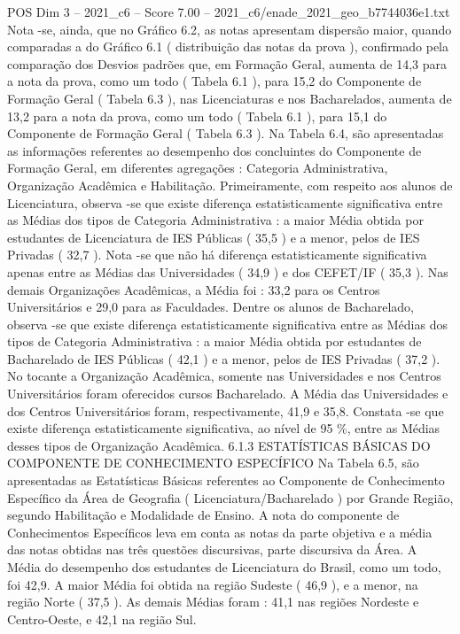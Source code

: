 \begin{textsample}{POS Dim 3 – 2021\_c6 – Score 7.00 – 2021\_c6/enade\_2021\_geo\_b7744036e1.txt}
Nota -se, ainda, que no Gráfico 6.2, as notas apresentam dispersão maior, quando comparadas a do Gráfico 6.1 ( distribuição das notas da prova ), confirmado pela comparação dos Desvios padrões que, em Formação Geral, aumenta de 14,3 para a nota da prova, como um todo ( Tabela 6.1 ), para 15,2 do Componente de Formação Geral ( Tabela 6.3 ), nas Licenciaturas e nos Bacharelados, aumenta de 13,2 para a nota da prova, como um todo ( Tabela 6.1 ), para 15,1 do Componente de Formação Geral ( Tabela 6.3 ).
Na Tabela 6.4, são apresentadas as informações referentes ao desempenho dos concluintes do Componente de Formação Geral, em diferentes agregações : Categoria Administrativa, Organização Acadêmica e Habilitação.
Primeiramente, com respeito aos alunos de Licenciatura, observa -se que existe diferença estatisticamente significativa entre as Médias dos tipos de Categoria Administrativa : a maior Média obtida por estudantes de Licenciatura de IES Públicas ( 35,5 ) e a menor, pelos de IES Privadas ( 32,7 ).
Nota -se que não há diferença estatisticamente significativa apenas entre as Médias das Universidades ( 34,9 ) e dos CEFET/IF ( 35,3 ).
Nas demais Organizações Acadêmicas, a Média foi : 33,2 para os Centros Universitários e 29,0 para as Faculdades.
Dentre os alunos de Bacharelado, observa -se que existe diferença estatisticamente significativa entre as Médias dos tipos de Categoria Administrativa : a maior Média obtida por estudantes de Bacharelado de IES Públicas ( 42,1 ) e a menor, pelos de IES Privadas ( 37,2 ).
No tocante a Organização Acadêmica, somente nas Universidades e nos Centros Universitários foram oferecidos cursos Bacharelado.
A Média das Universidades e dos Centros Universitários foram, respectivamente, 41,9 e 35,8.
Constata -se que existe diferença estatisticamente significativa, ao nível de 95 \%, entre as Médias desses tipos de Organização Acadêmica. 6.1.3 ESTATÍSTICAS BÁSICAS DO COMPONENTE DE CONHECIMENTO ESPECÍFICO Na Tabela 6.5, são apresentadas as Estatísticas Básicas referentes ao Componente de Conhecimento Específico da Área de Geografia ( Licenciatura/Bacharelado ) por Grande Região, segundo Habilitação e Modalidade de Ensino.
A nota do componente de Conhecimentos Específicos leva em conta as notas da parte objetiva e a média das notas obtidas nas três questões discursivas, parte discursiva da Área.
A Média do desempenho dos estudantes de Licenciatura do Brasil, como um todo, foi 42,9.
A maior Média foi obtida na região Sudeste ( 46,9 ), e a menor, na região Norte ( 37,5 ).
As demais Médias foram : 41,1 nas regiões Nordeste e Centro-Oeste, e 42,1 na região Sul.

\end{textsample}
